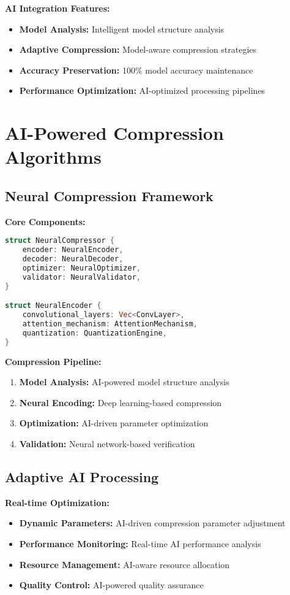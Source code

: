 \documentclass[12pt,a4paper]{article}
\begin{document}
\textbf{AI Integration Features:}
\begin{itemize}
    \item \textbf{Model Analysis:} Intelligent model structure analysis
    \item \textbf{Adaptive Compression:} Model-aware compression strategies
    \item \textbf{Accuracy Preservation:} 100\% model accuracy maintenance
    \item \textbf{Performance Optimization:} AI-optimized processing pipelines
\end{itemize}

\section{AI-Powered Compression Algorithms}

\subsection{Neural Compression Framework}

\textbf{Core Components:}
\begin{lstlisting}[language=Rust, caption=Neural Compression Framework]
struct NeuralCompressor {
    encoder: NeuralEncoder,
    decoder: NeuralDecoder,
    optimizer: NeuralOptimizer,
    validator: NeuralValidator,
}

struct NeuralEncoder {
    convolutional_layers: Vec<ConvLayer>,
    attention_mechanism: AttentionMechanism,
    quantization: QuantizationEngine,
}
\end{lstlisting}

\textbf{Compression Pipeline:}
\begin{enumerate}
    \item \textbf{Model Analysis:} AI-powered model structure analysis
    \item \textbf{Neural Encoding:} Deep learning-based compression
    \item \textbf{Optimization:} AI-driven parameter optimization
    \item \textbf{Validation:} Neural network-based verification
\end{enumerate}

\subsection{Adaptive AI Processing}

\textbf{Real-time Optimization:}
\begin{itemize}
    \item \textbf{Dynamic Parameters:} AI-driven compression parameter adjustment
    \item \textbf{Performance Monitoring:} Real-time AI performance analysis
    \item \textbf{Resource Management:} AI-aware resource allocation
    \item \textbf{Quality Control:} AI-powered quality assurance
\end{itemize}
\end{document}
